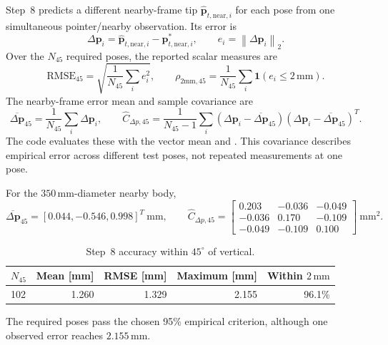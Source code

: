 \documentclass[11pt]{article}
\newcommand{\vct}[1]{\bm{#1}}
\newcommand{\norm}[1]{\left\|#1\right\|_2}
\begin{document}
Step~8 predicts a different nearby-frame tip
$\widehat{\vct p}_{t,\mathrm{near},i}$ for each pose from one simultaneous
pointer/nearby observation.  Its error is
\begin{equation}
\Delta\vct p_i
=\widehat{\vct p}_{t,\mathrm{near},i}
-\vct p_{t,\mathrm{near},i}^*,
\qquad e_i=\norm{\Delta\vct p_i}.
\end{equation}
Over the $N_{45}$ required poses, the reported scalar measures are
\begin{equation}
\mathrm{RMSE}_{45}=\sqrt{\frac1{N_{45}}\sum_i e_i^2},
\qquad
\rho_{2\mathrm{mm},45}=\frac1{N_{45}}\sum_i
\mathbf1(e_i\leq2\,\mathrm{mm}).
\end{equation}
The nearby-frame error mean and sample covariance are
\begin{equation}
\overline{\Delta\vct p}_{45}
=\frac1{N_{45}}\sum_i\Delta\vct p_i,
\qquad
\widehat C_{\Delta p,45}
=\frac1{N_{45}-1}\sum_i
(\Delta\vct p_i-\overline{\Delta\vct p}_{45})
(\Delta\vct p_i-\overline{\Delta\vct p}_{45})^T.
\end{equation}
The code evaluates these with the vector mean and
.  This covariance describes empirical error
across different test poses, not repeated measurements at one pose.

For the $350\,\mathrm{mm}$-diameter nearby body,
\begin{equation}
\overline{\Delta\vct p}_{45}
=[0.044,-0.546,0.998]^T\ \mathrm{mm},
\qquad
\widehat C_{\Delta p,45}
=\begin{bmatrix}
0.203&-0.036&-0.049\\
-0.036&0.170&-0.109\\
-0.049&-0.109&0.100
\end{bmatrix}\ \mathrm{mm}^2.
\end{equation}

\begin{table}[H]
\centering
\small
\caption{Step~8 accuracy within $45^\circ$ of vertical.}
\label{tab:validation-end-to-end}
\begin{tabular}{lrrrr}
\toprule
$N_{45}$ & Mean [mm] & RMSE [mm] & Maximum [mm] & Within $2\,\mathrm{mm}$ \\
\midrule
102 & 1.260 & 1.329 & 2.155 & 96.1\% \\
\bottomrule
\end{tabular}
\end{table}
The required poses pass the chosen 95\% empirical criterion, although one
observed error reaches $2.155\,\mathrm{mm}$.
\end{document}
